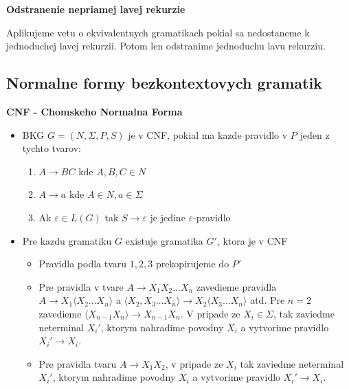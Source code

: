 \documentclass[12pt]{article}
\begin{document}
\textbf{Odstranenie nepriamej lavej rekurzie}

Aplikujeme vetu o ekvivalentnych gramatikach pokial sa nedostaneme k jednoduchej lavej rekurzii. Potom len odstranime jednoduchu
lavu rekurziu.

\subsection*{Normalne formy bezkontextovych gramatik}

\textbf{CNF - Chomskeho Normalna Forma}
\begin{itemize}
	\item BKG $G = (N, \Sigma, P, S)$ je v CNF, pokial ma kazde pravidlo v $P$ jeden z tychto tvarov:
		\begin{enumerate}
			\item $A \to BC$ kde $A,B,C \in N$
			\item $A \to a$ kde $A \in N, a \in \Sigma$
			\item Ak $\varepsilon \in L(G)$ tak $S \to \varepsilon$ je jedine $\varepsilon$-pravidlo
		\end{enumerate}
	\item Pre kazdu gramatiku $G$ existuje gramatika $G'$, ktora je v CNF
		\begin{itemize}
			\item Pravidla podla tvaru $1,2,3$ prekopirujeme do $P'$
			\item Pre pravidla v tvare $A \to X_{1}X_{2}...X_{n}$
				zavedieme pravidla $A \to X_{1}\langle X_{2}...X_{n}\rangle$ a $\langle X_{2},X_{3}...X_{n}\rangle \to X_{2}\langle X_{3}...X_{n}\rangle$ atd.
				Pre $n = 2$ zavedieme $\langle X_{n-1}X_{n}\rangle \to X_{n-1}X_{n}$.
				V pripade ze $X_{i} \in \Sigma$, tak zaviedme neterminal $X_{i}'$, ktorym nahradime povodny $X_{i}$ a vytvorime pravidlo
				$X_{i}' \to X_{i}$.
			\item Pre pravidla tvaru $A \to X_{1}X_{2}$, v pripade ze $X_{i}$ tak zaviedme neterminal $X_{i}'$,
				ktorym nahradime povodny $X_{i}$ a vytvorime pravidlo $X_{i}' \to X_{i}$.

		\end{itemize}
\end{itemize}
\end{document}
